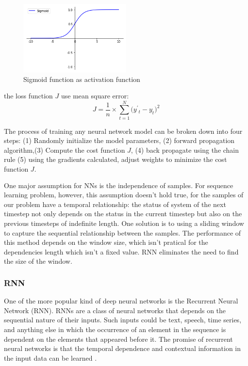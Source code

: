 \documentclass[5p]{elsarticle}
\begin{document}
\begin{figure}[h]
    \centering
    \includegraphics[width=0.5\textwidth]{sigmoid.png}
    \caption{Sigmoid function as activation function}
    \label{fig:sigmoid}
\end{figure}

the loss function $J$ use mean square error:
    $$J=\frac{1}{n}\times{\sum_{t=1}^N(y^{'}{_t}-y_t})^2$$

The process of training any neural network model can be broken down into four steps: (1) Randomly initialize the model parameters, (2) forward propagation algorithm,(3) Compute the cost function $J$, (4) back propagate using the chain rule  (5) using the gradients calculated, adjust weights to minimize the cost function $J$.

One major assumption for NNs is the independence of samples. For sequence learning problem, however, this assumption doesn't hold true, for the samples of our problem have a temporal relationship: the status of system of the next timestep not only depends on the status in the current timestep but also on the previous timesteps of indefinite length. One solution is to using a sliding window to capture the sequential relationship between the samples. The performance of this method depends on the window size, which isn't pratical for the dependencies length which isn't a fixed value. RNN eliminates the need to find the size of the window\cite{HermansTrainingNetworks}. 

\subsubsection{RNN}

One of the more popular kind of deep neural networks is the Recurrent Neural Network (RNN). RNNs are a class of neural networks that depends on the sequential nature of their inputs. Such inputs could be text, speech, time series, and anything else in which the occurrence of an element in the sequence is dependent on the elements that appeared before it. The promise of recurrent neural networks is that the temporal dependence and contextual information in the input data can be learned\cite{Bengio1994LearningDifficult} \cite{ChoLearningTranslation}. 
\end{document}
